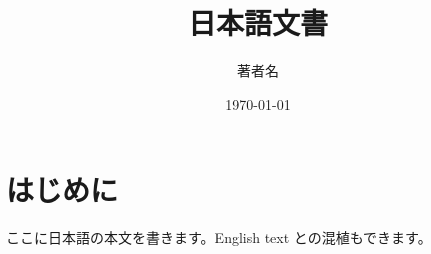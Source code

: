 \documentclass[11pt,a4paper]{article}
\title{日本語文書}
\author{著者名}
\date{\today}
\begin{document}
\maketitle
\section{はじめに}
ここに日本語の本文を書きます。English text との混植もできます。
\end{document}
